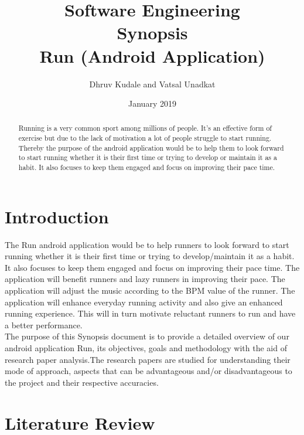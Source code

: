 \documentclass[10pt, a4paper]{article}
\title{Software Engineering \\ Synopsis \\ Run (Android Application)}
\author{Dhruv Kudale and Vatsal Unadkat}
\date{January 2019}
\begin{document}
\maketitle

\begin{abstract}
Running is a very common sport among millions of people. It's an effective form of exercise but due to the lack of motivation a lot of people struggle to start running. Thereby the purpose of the android application would be to help them to look forward to start running whether it is their first time or trying to develop or maintain it as a habit. It also focuses to keep them engaged and focus on improving their pace time.

\end{abstract}

\section{Introduction}
The Run android application would be to help runners to look forward to start running whether it is their first time or trying to develop/maintain it as a habit. It also focuses to keep them engaged and focus on improving their pace time. The application will benefit runners and lazy runners in improving their pace. The application will adjust the music according to the BPM value of the runner. The application will enhance everyday running activity and also give an enhanced running experience. This will in turn motivate reluctant runners to run and have a better performance.\\ The purpose of this Synopsis document is to provide a detailed overview of our android application Run, its objectives, goals and methodology with the aid of research paper analysis.The research papers are studied for understanding their mode of approach, aspects that can be advantageous and/or disadvantageous to the project and their respective accuracies. 


\section{Literature Review}
\end{document}
